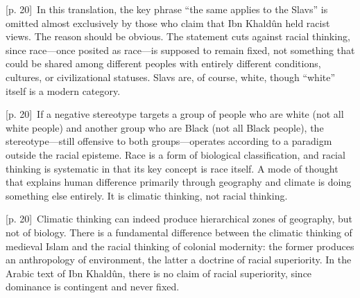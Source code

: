 \documentclass[10pt,a4paper]{article}
\begin{document}
{\scriptsize\color{gray} [p. 20]}\ In this translation, the key phrase “the same applies to the Slavs” is omitted almost exclusively by those who claim that Ibn Khaldûn held racist views. The reason should be obvious. The statement cuts against racial thinking, since race—once posited as race—is supposed to remain fixed, not something that could be shared among different peoples with entirely different conditions, cultures, or civilizational statuses. Slavs are, of course, white, though “white” itself is a modern category.\par
{\scriptsize\color{gray} [p. 20]}\ If a negative stereotype targets a group of people who are white (not all white people) and another group who are Black (not all Black people), the stereotype—still offensive to both groups—operates according to a paradigm outside the racial episteme. Race is a form of biological classification, and racial thinking is systematic in that its key concept is race itself. A mode of thought that explains human difference primarily through geography and climate is doing something else entirely. It is climatic thinking, not racial thinking.\par
{\scriptsize\color{gray} [p. 20]}\ Climatic thinking can indeed produce hierarchical zones of geography, but not of biology. There is a fundamental difference between the climatic thinking of medieval Islam and the racial thinking of colonial modernity: the former produces an anthropology of environment, the latter a doctrine of racial superiority. In the Arabic text of Ibn Khaldûn, there is no claim of racial superiority, since dominance is contingent and never fixed.\par
\end{document}
